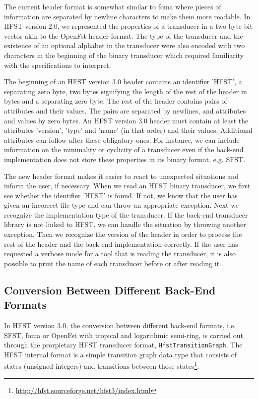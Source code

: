 \documentclass{llncs}
\begin{document}
The current header format is somewhat similar to foma where pieces of 
information are separated by newline characters to make them more
readable. In HFST version 2.0, we represented the properties of a
transducer in a two-byte bit vector akin to the OpenFst header
format. The type of the transducer and the existence of an optional
alphabet in the transducer were also encoded with two characters in the beginning of the
binary transducer which required familiarity with the specifications to interpret.

The beginning of an HFST version 3.0 header contains an identifier
'HFST', a separating zero byte, two bytes signifying the length of
the rest of the header in bytes and a separating zero byte. The rest
of the header contains pairs of attributes and their values. The pairs
are separated by newlines, and attributes and values by zero bytes. 
An HFST version 3.0 header must contain at least the attributes
'version', 'type' and 'name' (in that order) and their values. 
Additional attributes can follow after these obligatory ones. 
For instance, we can include information on the minimality or
cyclicity of a transducer even if the back-end implementation does not
store these properties in its binary format, e.g. SFST. 

The new header format makes it easier to react to unexpected
situations and inform the user, if necessary. When we read an HFST
binary transducer, we first see whether the identifier 'HFST' is
found. If not, we know that the user has given an incorrect
file type and can throw an appropriate exception. 
Next we recognize the implementation type of the transducer. 
If the back-end transducer library is not linked to HFST, we can handle
the situation by throwing another exception. 
Then we recognize the version of the header in order to process 
the rest of the header and the back-end implementation correctly. 
If the user has requested a verbose mode for a tool that is reading the
transducer, it is also possible to print the name of each transducer 
before or after reading it.

\subsection{Conversion Between Different Back-End Formats}
In HFST version 3.0, the conversion between different back-end formats, i.e. 
SFST, foma or OpenFst with tropical and logarithmic semi-ring,  is
carried out through the prorpietary HFST transducer format, \texttt{HfstTransitionGraph}. 
The HFST internal format is a simple transition graph data type that consists 
of states (unsigned integers) and transitions between those 
states\footnote{\url{http://hfst.sourceforge.net/hfst3/index.html}}.
 
\end{document}
